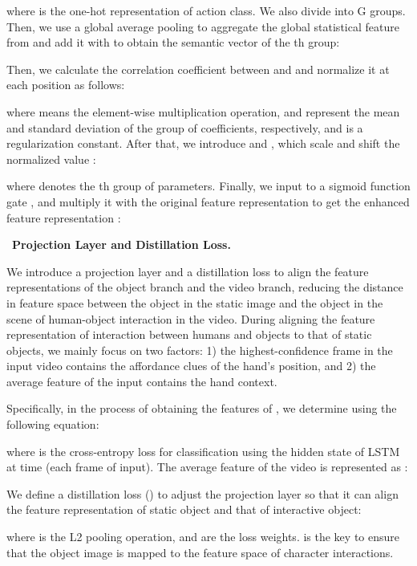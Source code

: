 \documentclass[journal,twoside]{IEEEtran}
\newcommand{\myPara}[1]{\vspace{5pt}\noindent~\textbf{#1} \quad}
\begin{document}
where  is the one-hot representation of action class. We also divide  into G groups.
Then, we use a global average pooling to aggregate the global statistical feature from  and add it with  to obtain the semantic vector  of the th group:


Then, we calculate the correlation coefficient  between  and  and normalize it at each position as follows:




where  means the element-wise multiplication operation,  and  represent the mean and standard deviation of the group of coefficients, respectively, and  is a regularization constant. After that, we introduce  and , which scale and shift the normalized value :

where  denotes the th group of parameters. Finally, we input  to a sigmoid function gate , and multiply it with the original feature representation  to get the enhanced feature representation :


\label{projection}
\myPara{Projection Layer and Distillation Loss.}

We introduce a projection layer and a distillation loss to align the feature representations of the object branch and the video branch, reducing the distance in feature space between the object in the static image and the object in the scene of human-object interaction in the video. During aligning the feature representation of interaction between humans and objects to that of static objects, we mainly focus on two factors: 1) the highest-confidence frame  in the input video contains the affordance clues of the hand's position, and 2) the average feature of the input contains the hand context. 

Specifically, in the process of obtaining the features of , we determine  using the following equation:

where  is the cross-entropy loss for classification using the hidden state of LSTM at time  (each frame of input). The average feature of the video is represented as :


We define a distillation loss () to adjust the projection layer so that it can align the feature representation of static object and that of interactive object:

where  is the L2 pooling operation,  and  are the loss weights.  is the key to ensure that the object image is mapped to the feature space of character interactions. 
\end{document}
